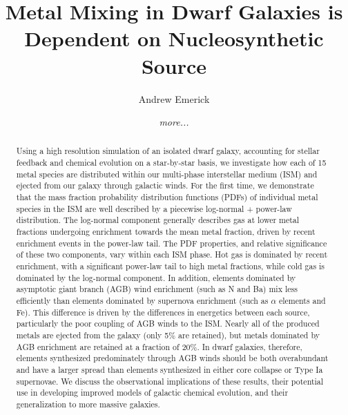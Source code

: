 \documentclass[twocolumn]{aastex61}
\begin{document}

\title{Metal Mixing in Dwarf Galaxies is Dependent on Nucleosynthetic Source}


\author{Andrew Emerick}
\author{{\it more...}}


\begin{abstract}
Using a high resolution simulation of an isolated dwarf galaxy, accounting for stellar feedback and chemical evolution on a star-by-star basis, we investigate how each of 15 metal species are distributed within our multi-phase interstellar medium (ISM) and ejected from our galaxy through galactic winds. For the first time, we demonstrate that the mass fraction probability distribution functions (PDFs) of individual metal species in the ISM are well described by a piecewise log-normal + power-law distribution. The log-normal component generally describes gas at lower metal fractions undergoing enrichment towards the mean metal fraction, driven by recent enrichment events in the power-law tail. The PDF properties, and relative significance of these two components, vary within each ISM phase. Hot gas is dominated by recent enrichment, with a significant power-law tail to high metal fractions, while cold gas is dominated by the log-normal component. In addition, elements dominated by asymptotic giant branch (AGB) wind enrichment (such as N and Ba) mix less efficiently than elements dominated by supernova enrichment (such as $\alpha$ elements and Fe). This difference is driven by the differences in energetics between each source, particularly the poor coupling of AGB winds to the ISM. Nearly all of the produced metals are ejected from the galaxy (only 5\% are retained), but metals dominated by AGB enrichment are retained at a fraction of 20\%. In dwarf galaxies, therefore, elements synthesized predominately through AGB winds should be both overabundant and have a larger spread than elements synthesized in either core collapse or Type Ia supernovae. We discuss the observational implications of these results, their potential use in developing improved models of galactic chemical evolution, and their generalization to more massive galaxies.
\end{abstract}
\end{document}

